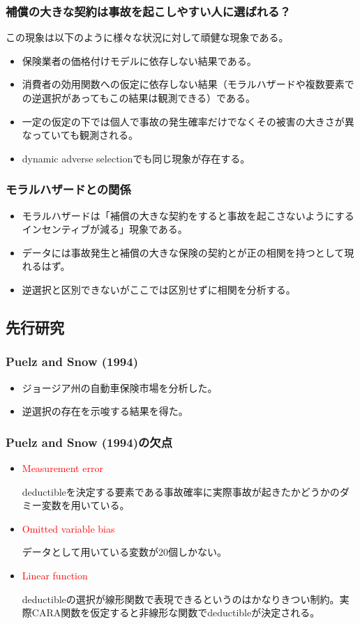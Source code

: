 \documentclass[dvipdfmx, 12pt]{beamer}
\begin{document}
\begin{frame}\frametitle{\small 補償の大きな契約は事故を起こしやすい人に選ばれる？}
この現象は以下のように様々な状況に対して頑健な現象である。
	\begin{itemize}
	\item 保険業者の価格付けモデルに依存しない結果である。
	\item 消費者の効用関数への仮定に依存しない結果（モラルハザードや複数要素での逆選択があってもこの結果は観測できる）である。
	\item 一定の仮定の下では個人で事故の発生確率だけでなくその被害の大きさが異なっていても観測される。
	\item dynamic adverse selectionでも同じ現象が存在する。
	\end{itemize}
\end{frame}

\begin{frame}\frametitle{モラルハザードとの関係}
	\begin{itemize}
	\item モラルハザードは「補償の大きな契約をすると事故を起こさないようにするインセンティブが減る」現象である。
	\item データには事故発生と補償の大きな保険の契約とが正の相関を持つとして現れるはず。
	\item 逆選択と区別できないがここでは区別せずに相関を分析する。
	\end{itemize}
\end{frame}


\subsection{先行研究}

\begin{frame}\frametitle{Puelz and Snow (1994)}
	\begin{itemize}
	\item ジョージア州の自動車保険市場を分析した。
	\item 逆選択の存在を示唆する結果を得た。
	\end{itemize}
\end{frame}

\begin{frame}\frametitle{Puelz and Snow (1994)の欠点}
	\begin{itemize}
	\item \textcolor{red}{Measurement error}
	
	deductibleを決定する要素である事故確率に実際事故が起きたかどうかのダミー変数を用いている。
	\item \textcolor{red}{Omitted variable bias}
	
	データとして用いている変数が20個しかない。
	\item \textcolor{red}{Linear function}
	
	deductibleの選択が線形関数で表現できるというのはかなりきつい制約。実際CARA関数を仮定すると非線形な関数でdeductibleが決定される。
	\end{itemize}
\end{frame}
\end{document}

